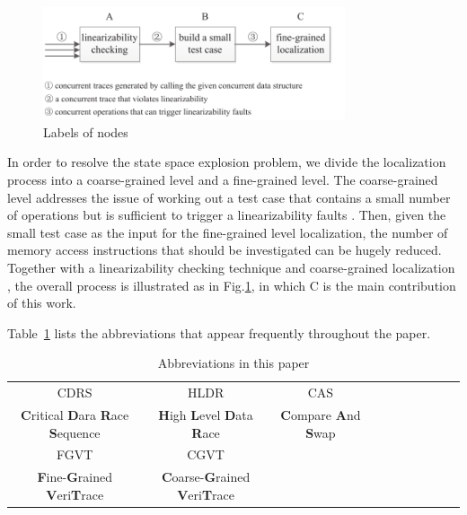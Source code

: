 \documentclass[runningheads]{llncs}
\begin{document}
 
\begin{figure}[ht]
\centering
\includegraphics[width = 3.5in]{liucheng.pdf}
\caption{Labels of nodes}\label{fig:liucheng}
\end{figure}

In order to resolve the state space explosion problem, we divide the localization process into a coarse-grained level and a fine-grained level.
The coarse-grained level addresses the issue of working out a test case that contains a small number of operations but is sufficient to trigger a linearizability faults \cite{DBLP:conf/seke/ZhangWZ17}. 
Then, given the small test case as the input
for the fine-grained level localization, the number of memory access instructions that should be investigated 
can be hugely reduced.
Together with a linearizability checking technique \cite{DBLP:journals/concurrency/Lowe17} and coarse-grained localization \cite{DBLP:conf/seke/ZhangWZ17}, the overall process is illustrated as in Fig.\ref{fig:liucheng}, in which C is the main contribution of this work.

Table~\ref{tab:abbreviation} lists the abbreviations that appear frequently throughout the paper.





\begin{table}[]
\centering
\caption{Abbreviations in this paper}
\label{tab:abbreviation}
\begin{tabular}{c|c|c|c|c|c|c|c|c|c}
 CDRS & HLDR & CAS \\
 \textbf{C}ritical \textbf{D}ara \textbf{R}ace \textbf{S}equence& \textbf{H}igh \textbf{L}evel \textbf{D}ata \textbf{R}ace & \textbf{C}ompare \textbf{A}nd \textbf{S}wap \\\hline
 FGVT & CGVT& \\
 \textbf{F}ine-\textbf{G}rained \textbf{V}eri\textbf{T}race &  \textbf{C}oarse-\textbf{G}rained \textbf{V}eri\textbf{T}race & 
\end{tabular}
\end{table}
\end{document}
